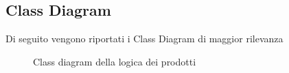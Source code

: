 \documentclass[12pt]{article}
\begin{document}
\subsection{Class Diagram}
Di seguito vengono riportati i Class Diagram di maggior rilevanza
\begin{figure}[h!]
	\begin{center}
  	 	 \caption{Class diagram della logica dei prodotti}
	\end{center}
\end{figure}
\end{document}
